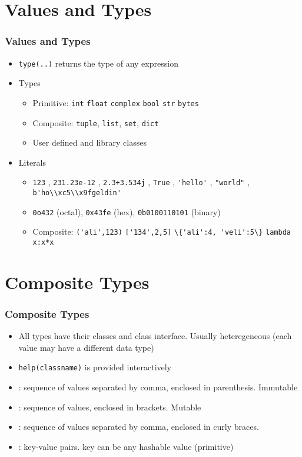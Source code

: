 \documentclass[trans,compress,xcolor=table]{beamer}
\begin{document}
\section{Values and Types}
\begin{frame}
\frametitle{Values and Types}
\begin{itemize}
\item \lstinline!type(..)! returns the type of any expression
\item Types
	\begin{itemize}
	\item Primitive: \lstinline!int! \lstinline!float! \lstinline!complex! \lstinline!bool! \lstinline!str! \lstinline!bytes!
	\item Composite: \lstinline!tuple!, \lstinline!list!, \lstinline!set!, \lstinline!dict!
	\item User defined and library classes
	\end{itemize}
\item Literals
	\begin{itemize}
		\item \lstinline!123! , \lstinline!231.23e-12! ,  \lstinline!2.3+3.534j!  , \lstinline!True!   , \lstinline!'hello'!  , \lstinline!"world"!  , \lstinline!b'ho\\xc5\\x9fgeldin'!
		\item \lstinline!0o432! (octal), \lstinline!0x43fe! (hex),
			\lstinline!0b0100110101! (binary)
		\item Composite: \lstinline!('ali',123)! \lstinline!['134',2,5]! \lstinline!\{'ali':4, 'veli':5\}! \lstinline!lambda x:x*x!
	\end{itemize}
\end{itemize}
\end{frame}

\section{Composite Types}
\begin{frame}
\frametitle{Composite Types}
\begin{itemize}
\item All types have their classes and class interface. Usually heteregeneous (each value may have a different data type)
\item \lstinline!help(classname)! is provided interactively
\item {}: sequence of values separated by comma, enclosed in parenthesis. Immutable
\item {}: sequence of values, enclosed in brackets. Mutable
\item {}:  sequence of values separated by comma, enclosed in curly braces.
\item {}: key-value pairs. key can be any hashable value (primitive)
\end{itemize}
\end{frame}
\end{document}
